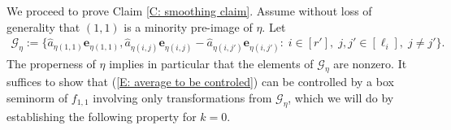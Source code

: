 \documentclass[11pt]{amsart}
\theoremstyle{definition}
\newcommand{\CG}{{\mathcal G}}
\newcommand{\be}{{\mathbf{e}}}
\newcommand{\1}{{\mathbf{1}}}
\begin{document}


  
We proceed to prove Claim \ref{C: smoothing claim}. Assume without loss of generality that $(1,1)$ is a minority pre-image of $\eta$. 
Let %
\begin{align*}
    \CG_\eta :=\{\hat{a}_{\eta(1,1)}\be_{\eta(1,1)}, \hat{a}_{\eta(i,j)}\be_{\eta(i,j)}-\hat{a}_{\eta(i,j')}\be_{\eta(i,j')}:\; i\in[r'],\; j,j'\in[\ell_{i}],\; j\neq j'\}.
\end{align*}
The properness of $\eta$ implies in particular that the elements of $\CG_\eta$ are nonzero.
It suffices to show that (\ref{E: average to be controled})  can be controlled by a box seminorm of $f_{1,1}$ involving only transformations from $\CG_{\eta}$, which we will do by establishing the following property for $k = 0$.
\end{document}
